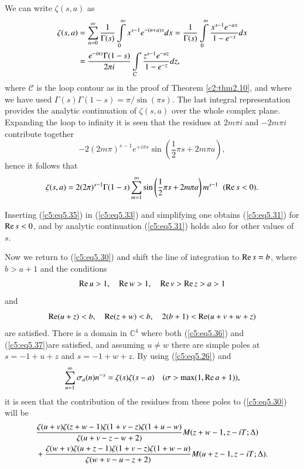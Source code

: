 We can write $\zeta(s,a)$ as
\begin{align}
\zeta(s,a) & =  \sum\limits^\infty_{n=0} \frac{1}{\Gamma(s)}
\int\limits^\infty_0 x^{s-1} e^{-(n+a)x} dx = \frac{1}{\Gamma(s)}
\int\limits^\infty_{0} \frac{x^{s-1} e^{-ax}}{1-e^{-x}} dx
\label{c5:eq5.34}\\ 
& = \frac{e^{- i \pi s} \Gamma (1-s)}{2 \pi i}
\int\limits_{\mathcal{C}} \frac{z^{s-1} e^{-az}}{1-e^{-z}} dz,\notag 
\end{align}
where $\mathcal{C}$ is the loop contour as in the proof of Theorem
\ref{c2:thm2.10}, and where we have used $\Gamma(s) \Gamma (1-s) = \pi
/\sin (\pi s)$. The last integral representation provides the analytic
continuation of $\zeta(s,a)$ over the  whole complex plane. Expanding
the loop to infinity it is seen that the residues at $2 m\pi i$ and
$-2 m \pi i$ contribute together 
$$
-2(2 m \pi)^{s-1} e^{+ i \pi s} \sin \left(\frac{1}{2} \pi s + 2 m \pi
a \right), 
$$
hence it follows that
{\fontsize{10pt}{12pt}\selectfont
\begin{equation}
\zeta (s,a) = 2 (2\pi)^{s-1} \Gamma(1-s) \sum\limits^\infty_{m=1} \sin
\left(\frac{1}{2} \pi s + 2 m \pi a \right)  m^{s-1}  \; \; (\operatorname{Re} s <
0).\label{c5:eq5.35} 
\end{equation}}

Inserting (\ref{c5:eq5.35}) in (\ref{c5:eq5.33}) and simplifying one
obtains (\ref{c5:eq5.31}) for $\operatorname{Re} s < 0$, and by analytic
continuation (\ref{c5:eq5.31}) holds also for other values of $s$. 

Now we return to (\ref{c5:eq5.30}) and shift the line of integration
to $\operatorname{Re} s =b$, where $b > a +1$ and the conditions 
\begin{equation}
\operatorname{Re} u > 1,\quad \operatorname{Re} w > 1,\quad \operatorname{Re} v > \operatorname{Re} z > a > 1\label{c5:eq5.36}
\end{equation}
and 
\begin{equation}
\operatorname{Re} (u+z) < b ,\quad \operatorname{Re} (z + w) < b,\quad 2 (b+1) < \operatorname{Re}
(u+v+w+z)\label{c5:eq5.37} 
\end{equation}
are satisfied. There is  a domain in $\mathbb{C}^4$ where both
(\ref{c5:eq5.36}) and (\ref{c5:eq5.37})\pageoriginale are satisfied,
and assuming $u \neq w$ there are simple poles at $s = -1 + u+ z$ and
$s = - 1 + w + z$. By using (\ref{c5:eq5.26}) and  
$$
\sum\limits^\infty_{n=1} \sigma_a (n) n^{-s} = \zeta (s) \zeta (s-a)
\quad ( \sigma > \max (1, \operatorname{Re} a + 1)),  
$$
it is seen that the contribution of the residues from these poles to
(\ref{c5:eq5.30}) will be 
{\fontsize{10pt}{12pt}\selectfont
\begin{align}
& \frac{\zeta(u+v) \zeta(z+w-1) \zeta(1+v-z)
  \zeta(1+u-w)}{\zeta(u+v-z-w+2)} M(z+w-1, z - i
T;\Delta)\label{c5:eq5.38}\\ 
& + \frac{\zeta(w+v) \zeta(u+z-1) \zeta(1+v-z)
  \zeta(1+w-u)}{\zeta(w+v-u-z+2)} M(u+z-1, z-iT;\Delta).\notag  
\end{align}}

